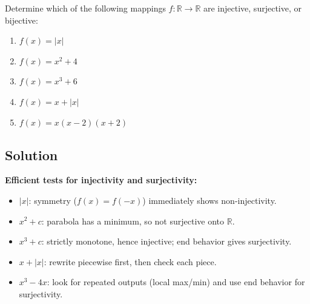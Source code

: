 \documentclass[12pt, a4paper]{article}
\newcommand{\R}{\mathbb{R}}
\begin{document}
\begin{theorybox}
\begin{center}
\end{center}
\end{theorybox}

\begin{problembox}
Determine which of the following mappings $f : \R \to \R$ are injective,
surjective, or bijective:
\begin{enumerate}[label=(\alph*), nosep]
  \item $f(x) = |x|$
  \item $f(x) = x^2 + 4$
  \item $f(x) = x^3 + 6$
  \item $f(x) = x + |x|$
  \item $f(x) = x(x-2)(x+2)$
\end{enumerate}
\end{problembox}

\subsection*{Solution}

\textbf{Efficient tests for injectivity and surjectivity:}
\begin{itemize}[nosep]
  \item $|x|$: symmetry ($f(x) = f(-x)$) immediately shows non-injectivity.
  \item $x^2 + c$: parabola has a minimum, so not surjective onto $\mathbb{R}$.
  \item $x^3 + c$: strictly monotone, hence injective; end behavior gives surjectivity.
  \item $x + |x|$: rewrite piecewise first, then check each piece.
  \item $x^3 - 4x$: look for repeated outputs (local max/min) and use end behavior for surjectivity.
\end{itemize}
\end{document}
